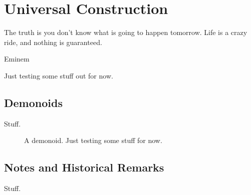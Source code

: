 
\renewcommand{\chapterfolder}{universal_construction/}
\chapter{Universal Construction}\label{chp:universal_construction}


\vspace*{-0.4in}
\epigraph{The truth is you don't know what is going to happen tomorrow. Life is a crazy ride, and nothing is guaranteed.}{Eminem}
\vspace*{0.4in}


\noindent Just testing some stuff out for now.


\section{Demonoids}\label{sec:demonoid}

Stuff.

\begin{figure}[!htb]
	\centering
	\caption{A demonoid. Just testing some stuff for now.}\label{fig:demonoid}
\end{figure}



\section*{Notes and Historical Remarks}

Stuff.


